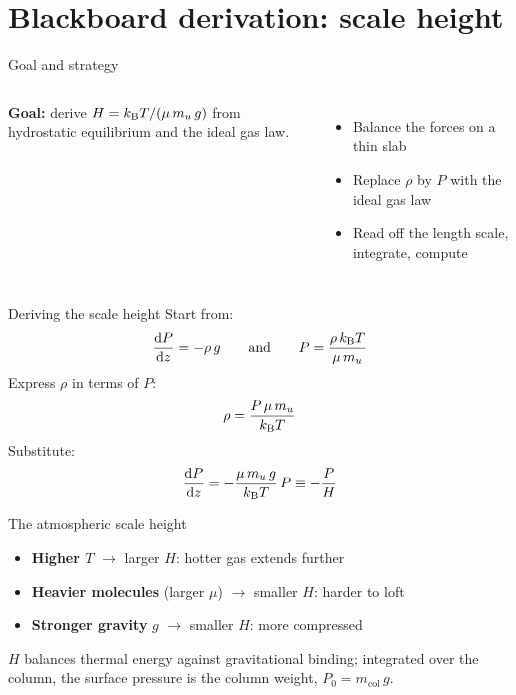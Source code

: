 \documentclass[aspectratio=169, 11pt]{beamer}
\begin{document}
\section{Blackboard derivation: scale height}

\begin{frame}{Goal and strategy}
  \begin{columns}[c]
    \column{\recapfigcolnarrow}
    \column{\recaptextcolwide}
    \textbf{Goal:} derive $H = k_{\mathrm{B}} T/(\mu\,m_u\,g)$ from hydrostatic equilibrium and the ideal gas law.
    \vskip8pt
    \begin{itemize}\setlength\itemsep{2pt}
      \item Balance the forces on a thin slab
      \item Replace $\rho$ by $P$ with the ideal gas law
      \item Read off the length scale, integrate, compute
    \end{itemize}
    \vskip8pt
  \end{columns}
\end{frame}

\begin{frame}{Deriving the scale height}
  Start from:
  $$\frac{\mathrm{d} P}{\mathrm{d} z} = -\rho\,g \qquad\text{and}\qquad P = \frac{\rho\,k_{\mathrm{B}} T}{\mu\,m_u}$$
  \vskip6pt
  Express $\rho$ in terms of $P$:
  $$\rho = \frac{P\,\mu\,m_u}{k_{\mathrm{B}} T}$$
  \vskip4pt
  Substitute:
  $$\frac{\mathrm{d} P}{\mathrm{d} z} = -\frac{\mu\,m_u\,g}{k_{\mathrm{B}} T}\,P \equiv -\frac{P}{H}$$
\end{frame}

\begin{frame}{The atmospheric scale height}
  \vskip8pt
  \begin{itemize}
    \item \textbf{Higher $T$} $\rightarrow$ larger $H$: hotter gas extends further
    \item \textbf{Heavier molecules} (larger $\mu$) $\rightarrow$ smaller $H$: harder to loft
    \item \textbf{Stronger gravity} $g$ $\rightarrow$ smaller $H$: more compressed
  \end{itemize}
  \vskip8pt
  $H$ balances thermal energy against gravitational binding; integrated over the column, the surface pressure is the column weight, $P_0 = m_{\mathrm{col}}\,g$.
\end{frame}
\end{document}
